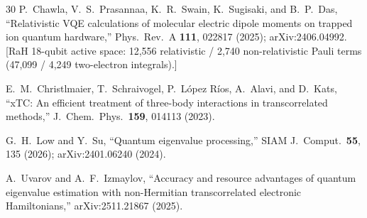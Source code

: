 \documentclass[aps,pra,twocolumn,superscriptaddress,longbibliography]{revtex4-2}
\newcommand{\gvq}[2]{#2}
\begin{document}
\begin{thebibliography}{30}
P.~Chawla, V.~S.~Prasannaa, K.~R.~Swain, K.~Sugisaki, and B.~P.~Das,
``Relativistic VQE calculations of molecular electric dipole moments on
trapped ion quantum hardware,'' Phys.\ Rev.\ A \textbf{111}, 022817 (2025);
arXiv:2406.04992.
[RaH 18-qubit active space: \gvq{chawla_rah}{12{,}556} relativistic / 2{,}740
non-relativistic Pauli terms (47{,}099 / 4{,}249 two-electron integrals).]

E.~M.~Christlmaier, T.~Schraivogel, P.~L\'opez R\'ios, A.~Alavi, and
D.~Kats, ``xTC: An efficient treatment of three-body interactions in
transcorrelated methods,'' J.\ Chem.\ Phys.\ \textbf{159}, 014113 (2023).

G.~H.~Low and Y.~Su, ``Quantum eigenvalue processing,'' SIAM
J.\ Comput.\ \textbf{55}, 135 (2026); arXiv:2401.06240 (2024).

A.~Uvarov and A.~F.~Izmaylov, ``Accuracy and resource advantages of
quantum eigenvalue estimation with non-Hermitian transcorrelated
electronic Hamiltonians,'' arXiv:2511.21867 (2025).

\end{thebibliography}
\end{document}
